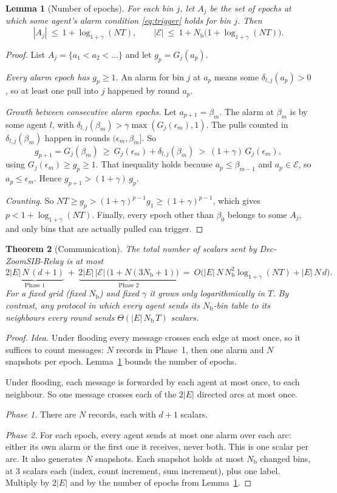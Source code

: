 \documentclass[11pt]{article}
\newtheorem{theorem}{Theorem}
\newtheorem{lemma}[theorem]{Lemma}
\theoremstyle{definition}
\newcommand{\Nb}{N_{\mathrm b}}
\newcommand{\cE}{\mathcal{E}}
\begin{document}
\begin{lemma}[Number of epochs]\label{lem:epochs}
For each bin $j$, let $A_j$ be the set of epochs at which some agent's alarm condition \eqref{eq:trigger} holds for bin
$j$. Then
\[
|A_j|\ \le\ 1+\log_{1+\gamma}(NT),\qquad
|\cE|\ \le\ 1+\Nb\big(1+\log_{1+\gamma}(NT)\big).
\]
\end{lemma}
\begin{proof}
List $A_j=\{a_1<a_2<\dots\}$ and let $g_p=G_j(a_p)$.

\emph{Every alarm epoch has $g_p\ge1$.} An alarm for bin $j$ at $a_p$ means some $\delta_{l,j}(a_p)>0$, so at least one
pull into $j$ happened by round $a_p$.

\emph{Growth between consecutive alarm epochs.} Let $a_{p+1}=\beta_m$. The alarm at $\beta_m$ is by some agent $l$, with
$\delta_{l,j}(\beta_m)>\gamma\max(G_j(\epsilon_m),1)$. The pulls counted in $\delta_{l,j}(\beta_m)$ happen in rounds
$(\epsilon_m,\beta_m]$. So
\[
g_{p+1}=G_j(\beta_m)\ \ge\ G_j(\epsilon_m)+\delta_{l,j}(\beta_m)\ >\ (1+\gamma)\,G_j(\epsilon_m),
\]
using $G_j(\epsilon_m)\ge g_p\ge1$. That inequality holds because $a_p\le\beta_{m-1}$ and $a_p\in\cE$, so $a_p\le\epsilon_m$.
Hence $g_{p+1}>(1+\gamma)\,g_p$.

\emph{Counting.} So $NT\ge g_p>(1+\gamma)^{p-1}g_1\ge(1+\gamma)^{p-1}$, which gives $p<1+\log_{1+\gamma}(NT)$.
Finally, every epoch other than $\beta_0$ belongs to some $A_j$, and only bins that are actually pulled can trigger.
\end{proof}

\begin{theorem}[Communication]\label{thm:comm}
The total number of scalars sent by Dec-ZoomSIB-Relay is at most
\[
\underbrace{2|E|\,N\,(d+1)}_{\text{Phase 1}}\ +\ \underbrace{2|E|\,|\cE|\,\big(1+N(3\Nb+1)\big)}_{\text{Phase 2}}
\ =\ O\big(|E|\,N\,\Nb^2\log_{1+\gamma}(NT)+|E|\,N\,d\big).
\]
For a fixed grid (fixed $\Nb$) and fixed $\gamma$ it grows only logarithmically in $T$. By contrast, any protocol in
which every agent sends its $\Nb$-bin table to its neighbours every round sends $\Theta(|E|\,\Nb\,T)$ scalars.
\end{theorem}
\begin{proof}
\emph{Idea.} Under flooding every message crosses each edge at most once, so it suffices to count messages: $N$ records
in Phase~1, then one alarm and $N$ snapshots per epoch. Lemma~\ref{lem:epochs} bounds the number of epochs.

Under flooding, each message is forwarded by each agent at most once, to each neighbour. So one message crosses each
of the $2|E|$ directed arcs at most once.

\emph{Phase 1.} There are $N$ records, each with $d+1$ scalars.

\emph{Phase 2.} For each epoch, every agent sends at most one alarm over each arc: either its own alarm or the first
one it receives, never both. This is one scalar per arc. It also generates $N$ snapshots. Each snapshot holds at most $\Nb$ changed bins, at 3
scalars each (index, count increment, sum increment), plus one label. Multiply by $2|E|$ and by the number of epochs
from Lemma~\ref{lem:epochs}.
\end{proof}
\end{document}
